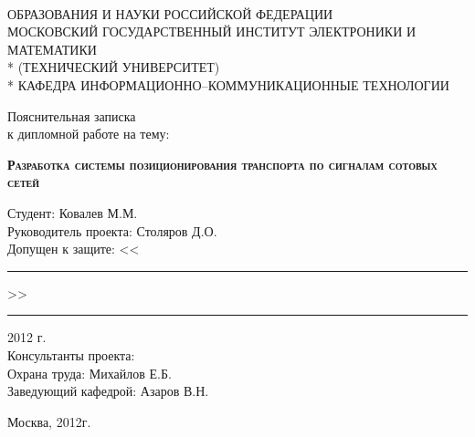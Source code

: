 
\begin{titlepage}
\newpage

\begin{center}
\hrulefill\\
{ ОБРАЗОВАНИЯ И НАУКИ РОССИЙСКОЙ ФЕДЕРАЦИИ\\
МОСКОВСКИЙ ГОСУДАРСТВЕННЫЙ ИНСТИТУТ ЭЛЕКТРОНИКИ И МАТЕМАТИКИ\\*
(ТЕХНИЧЕСКИЙ УНИВЕРСИТЕТ)}\\*
\vspace{1em}
КАФЕДРА ИНФОРМАЦИОННО--КОММУНИКАЦИОННЫЕ ТЕХНОЛОГИИ
\end{center}


\vspace{1em}

\begin{center}
\Large Пояснительная записка \\ к дипломной работе на тему:
\end{center}

\vspace{1em}

\begin{center}
\textsc{\textbf{Разработка системы позиционирования транспорта по сигналам сотовых сетей}}
\end{center}

\vfill

\begin{flushleft}
Студент: \hfill Ковалев М.М.\\
\vspace{3em}
Руководитель проекта: \hfill Столяров Д.О.\\
\vspace{3em}
Допущен к защите: \hfill <<\rule{1em}{0.01pt}>> \rule{5em}{0.01pt} 2012 г.\\
\vspace{2.5em}
Консультанты проекта:\\
Охрана труда: \hfill Михайлов Е.Б.\\
\vspace{2.5em}
Заведующий кафедрой: \hfill Азаров В.Н.\\
\end{flushleft}

\vspace{\fill}

\begin{center}
Москва, 2012г.
\end{center}

\end{titlepage}
